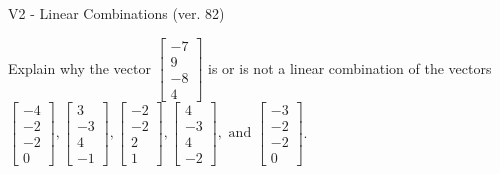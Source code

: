 \begin{exercise}
  \begin{exerciseTitle}V2 - Linear Combinations (ver. 82)\end{exerciseTitle}
  \begin{exerciseStatement}
    Explain why the vector \(\left[\begin{array}{c}
-7 \\
9 \\
-8 \\
4
\end{array}\right]\)  is or is not a linear 
	combination of the vectors \(\left[\begin{array}{c}
-4 \\
-2 \\
-2 \\
0
\end{array}\right] , \left[\begin{array}{c}
3 \\
-3 \\
4 \\
-1
\end{array}\right] , \left[\begin{array}{c}
-2 \\
-2 \\
2 \\
1
\end{array}\right] , \left[\begin{array}{c}
4 \\
-3 \\
4 \\
-2
\end{array}\right] , \text{ and } \left[\begin{array}{c}
-3 \\
-2 \\
-2 \\
0
\end{array}\right]\).
	



\end{exerciseStatement}
\end{exercise}
